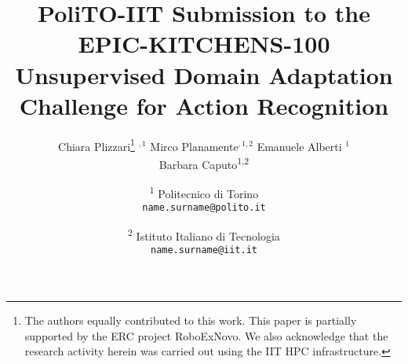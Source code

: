 \documentclass[10pt,twocolumn,letterpaper]{article}
\begin{document}
\title{PoliTO-IIT Submission to the EPIC-KITCHENS-100 Unsupervised Domain Adaptation Challenge for Action Recognition}

\author{Chiara Plizzari{\thanks{The authors equally contributed to this work. This paper is partially supported by the ERC project RoboExNovo. We also acknowledge
that the research activity herein was carried out using the IIT
HPC infrastructure.}} $^{, 1}$ \quad
Mirco Planamente\footnotemark[1] $^{, 1,2}$ \quad 
Emanuele Alberti $^{1}$ \quad



Barbara Caputo\textsuperscript{1,2} \\


\and \textsuperscript{1} Politecnico di Torino\\
{\tt\small {name.surname}@polito.it}

\and \textsuperscript{2} Istituto Italiano di Tecnologia\\
{\tt\small {name.surname}@iit.it}
}

\maketitle








{\small


}
\end{document}
